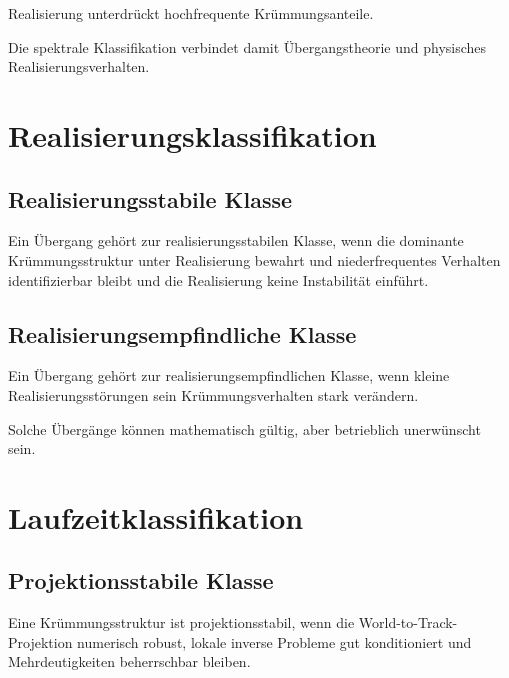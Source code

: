 \begin{proposition}
\label{prop:classification-spectral-realization}
Realisierung unterdrückt hochfrequente Krümmungsanteile.
\end{proposition}
Die spektrale Klassifikation verbindet damit Übergangstheorie und physisches
Realisierungsverhalten.

\section{Realisierungsklassifikation}

\subsection{Realisierungsstabile Klasse}
\begin{definition}
\label{def:realization-stable-class}
Ein Übergang gehört zur realisierungsstabilen Klasse, wenn die dominante
Krümmungsstruktur unter Realisierung bewahrt und niederfrequentes Verhalten
identifizierbar bleibt und die Realisierung keine Instabilität einführt.
\end{definition}

\subsection{Realisierungsempfindliche Klasse}
\begin{definition}
\label{def:realization-sensitive-class}
Ein Übergang gehört zur realisierungsempfindlichen Klasse, wenn kleine
Realisierungsstörungen sein Krümmungsverhalten stark verändern.
\end{definition}
Solche Übergänge können mathematisch gültig, aber betrieblich unerwünscht
sein.

\section{Laufzeitklassifikation}

\subsection{Projektionsstabile Klasse}
\begin{definition}
\label{def:projection-stable-class}
Eine Krümmungsstruktur ist projektionsstabil, wenn die
World-to-Track-Projektion numerisch robust, lokale inverse Probleme gut
konditioniert und Mehrdeutigkeiten beherrschbar bleiben.
\end{definition}

